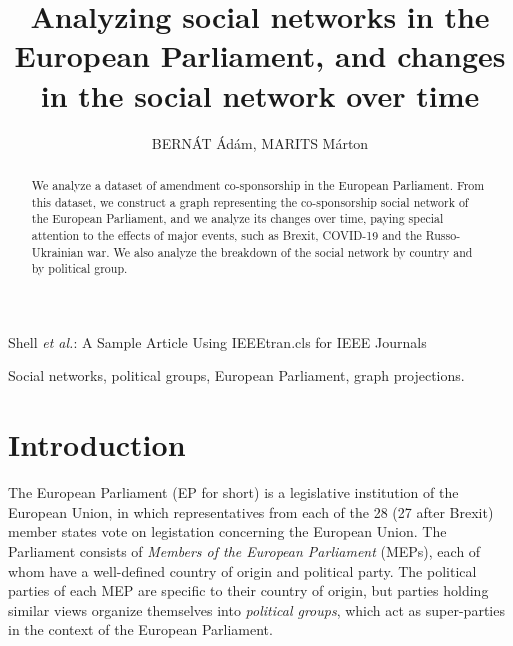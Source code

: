 \documentclass[lettersize,journal]{IEEEtran}
\begin{document}
\title{Analyzing social networks in the European Parliament, and changes in the social network over time}

\author{{BERNÁT Ádám, MARITS Márton}
}

%
{Shell \MakeLowercase{\textit{et al.}}: A Sample Article Using IEEEtran.cls for IEEE Journals}


\maketitle

\begin{abstract}
We analyze a dataset of amendment co-sponsorship in the European Parliament. From this dataset, we construct a graph representing the co-sponsorship social network of the European Parliament, and we analyze its changes over time, paying special attention to the effects of major events, such as Brexit, COVID-19 and the Russo-Ukrainian war. We also analyze the breakdown of the social network by country and by political group.
\end{abstract}

\begin{IEEEkeywords}
Social networks, political groups, European Parliament, graph projections.
\end{IEEEkeywords}

\section{Introduction}



The European Parliament (EP for short) is a legislative institution of the European Union, in which representatives from each of the 28 (27 after Brexit) member states vote on legistation concerning the European Union. The Parliament consists of \textit{Members of the European Parliament} (MEPs), each of whom have a well-defined country of origin and political party. The political parties of each MEP are specific to their country of origin, but parties holding similar views organize themselves into \textit{political groups}, which act as super-parties in the context of the European Parliament.
\end{document}
